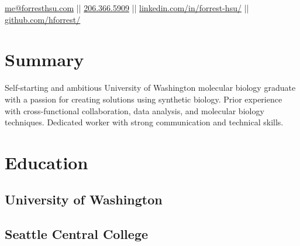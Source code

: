 \documentclass[]{forrest-resume-interfont}
\begin{document}
%
%

\lastupdated



%
%

{
	\href{mailto:me@forresthsu.com}{me@forresthsu.com} || 
	\href{tel:2063665909}{206.366.5909} || 
	\href{https://www.linkedin.com/in/forrest-hsu/}{linkedin.com/in/forrest-hsu/} ||
	\href{https://github.com/HForrest/}{github.com/hforrest/}
}

\section{Summary}
\raggedright %
Self-starting and ambitious University of Washington molecular biology graduate with a passion for creating solutions using synthetic biology. 
Prior experience with cross-functional collaboration, data analysis, and molecular biology techniques.
Dedicated worker with strong communication and technical skills. 
\sectionsep


\section{ Education}
\subsection{University of Washington}
\sectionsep
\subsection{Seattle Central College}
\sectionsep

\end{document}
